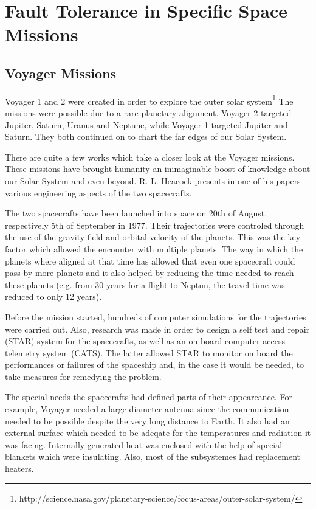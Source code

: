 \section{Fault Tolerance in Specific Space Missions}

 
\subsection{Voyager Missions}

Voyager 1 and 2 \cite{vo1-nasa}\cite{vo2-nasa} were created in order to explore
the outer solar
system\footnote{http://science.nasa.gov/planetary-science/focus-areas/outer-solar-system/}
The missions were possible due to a rare planetary alignment. Voyager 2 targeted
Jupiter, Saturn, Uranus and Neptune, while Voyager 1 targeted Jupiter and
Saturn. They both continued on to chart the far edges of our Solar System.

There are quite a few works which take a closer look at the Voyager missions.
These missions have brought humanity an inimaginable boost of knowledge about
our Solar System and even beyond. R. L. Heacock presents in one of his
papers~\cite{tvs} various engineering aspects of the two spacecrafts.

The two spacecrafts have been launched into space on 20th of August,
respectively 5th of September in 1977. Their trajectories were controled through
the use of the gravity field and orbital velocity of the planets. This was the
key factor which allowed the encounter with multiple planets. The way in which
the planets where aligned at that time has allowed that even one spacecraft
could pass by more planets and it also helped by reducing the time needed to
reach these planets (e.g. from 30 years for a flight to Neptun, the travel time
was reduced to only 12 years).

Before the mission started, hundreds of computer simulations for the
trajectories were carried out. Also, research was made in order to design a self
test and repair (STAR) system for the spacecrafts, as well as an on board
computer access telemetry system (CATS). The latter allowed STAR to monitor on
board the performances or failures of the spaceship and, in the case it would be
needed, to take measures for remedying the problem.

The special needs the spacecrafts had defined parts of their appeareance. For
example, Voyager needed a large diameter antenna since the communication needed
to be possible despite the very long distance to Earth. It also had an external
surface which needed to be adeqate for the temperatures and radiation it was
facing. Internally generated heat was enclosed with the help of special blankets
which were insulating. Also, most of the subsystemes had replacement heaters.

